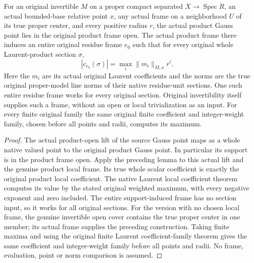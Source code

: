 \begin{corollary}\label{cor:fc-native-laurent-support-frame-values}
\leanok
{}
For an original invertible $M$ on a proper compact separated
$X\to\operatorname{Spec}R$, an actual bounded-base relative point
$x$, any actual frame on a neighborhood $U$ of its true proper
center, and every positive radius $r$, the actual product Gauss
point lies in the original product frame open. The actual product
frame there induces an entire original residue frame $e_0$ such
that for every original whole Laurent-product section $\sigma$,
\[
 |c_{e_0}(\sigma)|=\max_i\|m_i\|_{M,x}r^i.
\]
Here the $m_i$ are its actual original Laurent coefficients and
the norms are the true original proper-model line norms of their
native residue-unit sections. One such entire residue frame works
for every original section. Original invertibility itself supplies
such a frame, without an open or local trivialization as an input. For every finite original family the
same original finite coefficient and integer-weight family,
chosen before all points and radii, computes its maximum.
\end{corollary}
\begin{proof}
The actual product-open lift of the source Gauss point maps as a
whole native valued point to the original product Gauss point.
In particular its support is in the product frame open. Apply
the preceding lemma to this actual lift and the genuine product
local frame. Its true whole scalar coefficient is exactly the
original product local coefficient. The native Laurent local
coefficient theorem computes its value by the stated original
weighted maximum, with every negative exponent and zero included.
The entire support-induced frame has no section input, so it
works for all original sections. For the version with no chosen local
frame, the genuine invertible open cover contains the true proper
center in one member; its actual frame supplies the preceding
construction. Taking finite maxima and using
the original finite Laurent coefficient-family theorem gives the
same coefficient and integer-weight family before all points and
radii. No frame, evaluation, point or norm comparison is assumed.
\end{proof}

